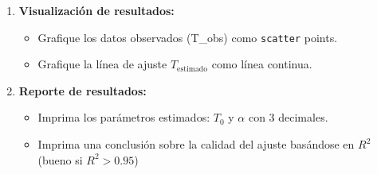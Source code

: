 \documentclass[10pt]{article}
\begin{document}
\begin{tcolorbox}[title={Pregunta 1 – Ley de Enfriamiento de Newton (np.polyfit)}]
\begin{enumerate}
  \item \textbf{Visualización de resultados:}
  \begin{itemize}
    \item Grafique los datos observados (T\_obs) como \texttt{scatter} points.
    \item Grafique la línea de ajuste $T_{\text{estimado}}$ como línea continua.
  \end{itemize}
  
  \item \textbf{Reporte de resultados:}
  \begin{itemize}
    \item Imprima los parámetros estimados: $T_0$ y $\alpha$ con 3 decimales.
    \item Imprima una conclusión sobre la calidad del ajuste basándose en $R^2$ (bueno si $R^2 > 0.95$)
  \end{itemize}
\end{enumerate}

\end{tcolorbox}

\end{document}
